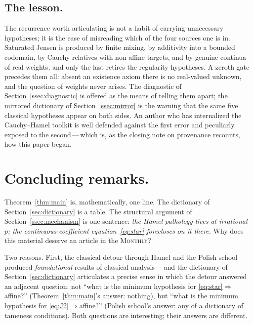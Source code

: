 \documentclass{article}
\theoremstyle{plain}
\theoremstyle{definition}
\begin{document}
\subsection{The lesson.}
\label{ssec:lesson}

The recurrence worth articulating is not a habit of carrying
unnecessary hypotheses; it is the ease of misreading which of the
four sources one is in. Saturated Jensen is produced by finite
mixing, by additivity into a bounded codomain, by Cauchy relatives
with non-affine targets, and by genuine continua of real weights,
and only the last retires the regularity hypotheses. A zeroth gate
precedes them all: absent an existence axiom there is no real-valued
unknown, and the question of weights never arises. The diagnostic
of Section~\ref{ssec:diagnostic} is offered as the means of telling
them apart; the mirrored dictionary of Section~\ref{ssec:mirror} is
the warning that the same five classical hypotheses appear on both
sides. An author who has internalized the Cauchy--Hamel toolkit is
well defended against the first error and peculiarly exposed to the
second\,---\,which is, as the closing note on provenance recounts,
how this paper began.

\section{Concluding remarks.}
\label{sec:conclusion}

Theorem~\ref{thm:main} is, mathematically, one line. The dictionary of
Section~\ref{sec:dictionary} is a table. The structural
argument of Section~\ref{ssec:mechanism} is one sentence: \emph{the
Hamel pathology lives at irrational~$p$; the continuous-coefficient
equation~\eqref{eq:star} forecloses on it there.} Why does this material
deserve an article in the \textsc{Monthly}?

Two reasons. First, the classical detour through Hamel and the Polish
school produced \emph{foundational} results of classical
analysis\,---\,and the dictionary of Section~\ref{sec:dictionary}
articulates a precise sense in which the detour answered an adjacent
question: not ``what is the minimum hypothesis for
\eqref{eq:star}$\Rightarrow$affine?'' (Theorem~\ref{thm:main}'s
answer: nothing), but ``what is the minimum hypothesis for
\eqref{eq:J2}$\Rightarrow$affine?'' (Polish school's answer: any of a
dictionary of tameness conditions). Both questions are interesting;
their answers are different.
\end{document}
